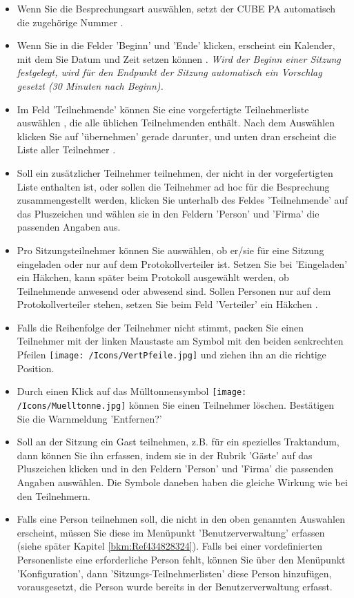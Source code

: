 \begin{itemize}
\item 
Wenn Sie die Besprechungsart auswählen, setzt der CUBE PA automatisch die zugehörige Nummer .
\item 
Wenn Sie in die Felder 'Beginn' und 'Ende' klicken, erscheint ein Kalender, mit dem Sie Datum und Zeit setzen können . \textit{Wird der Beginn einer Sitzung festgelegt, wird für den Endpunkt der Sitzung automatisch ein Vorschlag gesetzt (30 Minuten nach Beginn).}
\item 
Im Feld 'Teilnehmende' können Sie eine vorgefertigte Teilnehmerliste auswählen , die alle üblichen Teilnehmenden enthält. Nach dem Auswählen klicken Sie auf 'übernehmen'  gerade darunter, und unten dran erscheint die Liste aller Teilnehmer .
\item 
Soll ein zusätzlicher Teilnehmer teilnehmen, der nicht in der vorgefertigten Liste enthalten ist, oder sollen die Teilnehmer ad hoc für die Besprechung zusammengestellt werden, klicken Sie unterhalb des Feldes 'Teilnehmende' auf das Pluszeichen  und wählen sie in den Feldern 'Person' und 'Firma' die passenden Angaben aus. 
\item
Pro Sitzungsteilnehmer können Sie auswählen, ob er/sie für eine Sitzung eingeladen oder nur auf dem Protokollverteiler ist. Setzen Sie bei 'Eingeladen'  ein Häkchen, kann später beim Protokoll ausgewählt werden, ob Teilnehmende anwesend oder abwesend sind. Sollen Personen nur auf dem Protokollverteiler stehen, setzen Sie beim Feld 'Verteiler' ein Häkchen .
\item 
Falls die Reihenfolge der Teilnehmer nicht stimmt, packen Sie einen Teilnehmer mit der linken Maustaste am Symbol mit den beiden senkrechten Pfeilen \texttt{[image: /Icons/VertPfeile.jpg]}  und ziehen ihn an die richtige Position.
\item 
Durch einen Klick auf das Mülltonnensymbol \texttt{[image: /Icons/Muelltonne.jpg]}  können Sie einen Teilnehmer löschen. Bestätigen Sie die Warnmeldung 'Entfernen?'
\item 
Soll an der Sitzung ein Gast teilnehmen, z.B. für ein spezielles Traktandum, dann können Sie ihn erfassen, indem sie in der Rubrik 'Gäste' auf das Pluszeichen klicken und in den Feldern 'Person' und 'Firma' die passenden Angaben auswählen. Die Symbole daneben haben die gleiche Wirkung wie bei den Teilnehmern.
\item 
Falls eine Person teilnehmen soll, die nicht in den oben genannten Auswahlen erscheint, müssen Sie diese im Menüpunkt 'Benutzerverwaltung' erfassen (siehe später Kapitel \ref{bkm:Ref434828324}). Falls bei einer vordefinierten Personenliste eine erforderliche Person fehlt, können Sie über den Menüpunkt 'Konfiguration', dann 'Sitzungs-Teilnehmerlisten' diese Person hinzufügen, vorausgesetzt, die Person wurde bereits in der Benutzerverwaltung erfasst.
\end{itemize}

